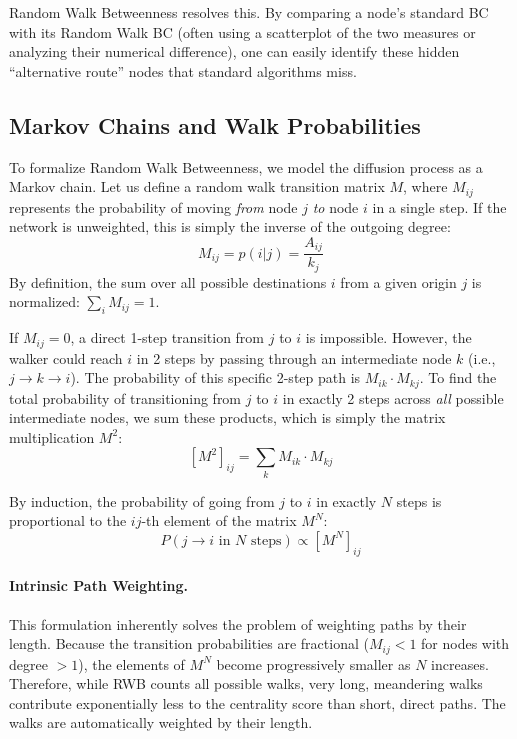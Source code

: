 Random Walk Betweenness resolves this. By comparing a node's standard BC with its Random Walk BC (often using a scatterplot of the two measures or analyzing their numerical difference), one can easily identify these hidden ``alternative route'' nodes that standard algorithms miss.

\subsection{Markov Chains and Walk Probabilities}

To formalize Random Walk Betweenness, we model the diffusion process as a Markov chain. Let us define a random walk transition matrix $M$, where $M_{ij}$ represents the probability of moving \textit{from} node $j$ \textit{to} node $i$ in a single step. If the network is unweighted, this is simply the inverse of the outgoing degree:
\[
    M_{ij} = p(i|j) = \frac{A_{ij}}{k_j}
\]
By definition, the sum over all possible destinations $i$ from a given origin $j$ is normalized: $\sum_i M_{ij} = 1$.

If $M_{ij} = 0$, a direct 1-step transition from $j$ to $i$ is impossible. However, the walker could reach $i$ in 2 steps by passing through an intermediate node $k$ (i.e., $j \to k \to i$). The probability of this specific 2-step path is $M_{ik} \cdot M_{kj}$. To find the total probability of transitioning from $j$ to $i$ in exactly 2 steps across \textit{all} possible intermediate nodes, we sum these products, which is simply the matrix multiplication $M^2$:
\[
    [M^2]_{ij} = \sum_k M_{ik} \cdot M_{kj}
\]

By induction, the probability of going from $j$ to $i$ in exactly $N$ steps is proportional to the $ij$-th element of the matrix $M^N$:
\[
    P(j \to i \text{ in } N \text{ steps}) \propto [M^N]_{ij}
\]

\paragraph{Intrinsic Path Weighting.}
This formulation inherently solves the problem of weighting paths by their length. Because the transition probabilities are fractional ($M_{ij} < 1$ for nodes with degree $>1$), the elements of $M^N$ become progressively smaller as $N$ increases. Therefore, while RWB counts all possible walks, very long, meandering walks contribute exponentially less to the centrality score than short, direct paths. The walks are automatically weighted by their length.

